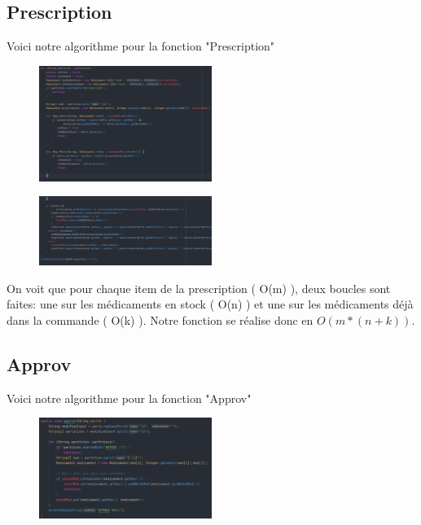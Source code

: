 \documentclass{article}
\begin{document}
\subsection{Prescription}

Voici notre algorithme pour la fonction "Prescription"

\begin{figure}[htp]
\centering
\includegraphics[width=0.5\textwidth]{Presc1.png}
\end{figure}

\begin{figure}[htp]
\centering
\includegraphics[width=0.5\textwidth]{Presc2.png}
\end{figure}

On voit que pour chaque item de la prescription ( O(m) ), deux boucles sont faites: une sur les médicaments en stock ( O(n) ) et une sur les médicaments déjà dans la commande ( O(k) ). Notre fonction se réalise donc en $O(m * (n+k))$.

\subsection{Approv}

Voici notre algorithme pour la fonction "Approv"

\begin{figure}[htp]
\centering
\includegraphics[width=0.5\textwidth]{Approv.png}
\end{figure}
\end{document}
